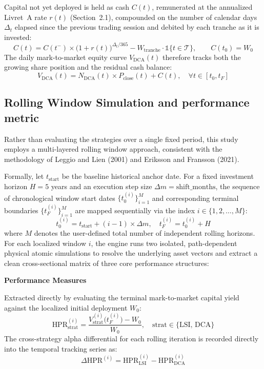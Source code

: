 \documentclass[11pt,a4paper]{article}
\begin{document}
Capital not yet deployed is held as cash $C(t)$, remunerated at the annualized Livret~A rate $r(t)$ (Section~2.1), compounded on the number of calendar days $\Delta_t$ elapsed since the previous trading session and debited by each tranche as it is invested:
\begin{equation}
C(t) = C(t^-) \times \big(1 + r(t)\big)^{\Delta_t / 365} - W_{\text{tranche}} \cdot \mathbb{1}\{t \in \mathcal{T}\}, \qquad C(t_0) = W_0
\end{equation}
The daily mark-to-market equity curve $V_{\text{DCA}}(t)$ therefore tracks both the growing share position and the residual cash balance:
\begin{equation}
V_{\text{DCA}}(t) = N_{\text{DCA}}(t) \times P_{\text{close}}(t) + C(t), \quad \forall t \in [t_0, t_F]
\end{equation}

\subsection{Rolling Window Simulation and performance metric}

Rather than evaluating the strategies over a single fixed period, this study employs a multi-layered rolling window approach, consistent with the methodology of Leggio and Lien (2001) and Eriksson and Fransson (2021).

Formally, let $t_{\text{start}}$ be the baseline historical anchor date. For a fixed investment horizon $H = 5$ years and an execution step size $\Delta m = \text{shift\_months}$, the sequence of chronological window start dates $\{t_0^{(i)}\}_{i=1}^M$ and corresponding terminal boundaries $\{t_F^{(i)}\}_{i=1}^M$ are mapped sequentially via the index $i \in \{1, 2, \dots, M\}$:
\begin{equation}
t_0^{(i)} = t_{\text{start}} + (i - 1) \times \Delta m, \quad t_F^{(i)} = t_0^{(i)} + H
\end{equation}
where $M$ denotes the user-defined total number of independent rolling horizons. For each localized window $i$, the engine runs two isolated, path-dependent physical atomic simulations to resolve the underlying asset vectors and extract a clean cross-sectional matrix of three core performance structures:

\textbf{Performance Measures}

Extracted directly by evaluating the terminal mark-to-market capital yield against the localized initial deployment $W_0$:
\begin{equation}
\text{HPR}_{\text{strat}}^{(i)} = \frac{V_{\text{strat}}^{(i)}\big(t_F^{(i)}\big) - W_0}{W_0}, \quad \text{strat} \in \{\text{LSI, DCA}\}
\end{equation}
The cross-strategy alpha differential for each rolling iteration is recorded directly into the temporal tracking series as:
\begin{equation}
\Delta\text{HPR}^{(i)} = \text{HPR}_{\text{LSI}}^{(i)} - \text{HPR}_{\text{DCA}}^{(i)}
\end{equation}
\end{document}
